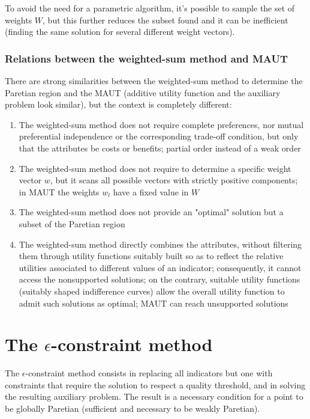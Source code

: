 To avoid the need for a parametric algorithm, it's possible to sample the set of weights $W$, but this further reduces the subset found and it can be inefficient (finding the same solution for several different weight vectors).

\subsubsection{Relations between the weighted-sum method and MAUT}

There are strong similarities between the weighted-sum method to determine the Paretian region and the MAUT (additive utility function and the auxiliary problem look similar), but the context is completely different:
\begin{enumerate}
	\item The weighted-sum method does not require complete preferences, nor mutual preferential independence or the corresponding trade-off condition, but only that the attributes be costs or benefits; partial order instead of a weak order
	
	\item The weighted-sum method does not require to determine a specific weight vector $w$, but it scans all possible vectors with strictly positive components; in MAUT the weights $w_l$ have a fixed value in $W$
	
	\item The weighted-sum method does not provide an "optimal" solution but a subset of the Paretian region 
	
	\item The weighted-sum method directly combines the attributes, without filtering them through utility functions suitably built so as to reflect the relative utilities associated to different values of an indicator; consequently, it cannot access the nonsupported solutions; on the contrary, suitable utility functions (suitably shaped indifference curves) allow the overall utility function to admit such solutions as optimal; MAUT can reach unsupported solutions
\end{enumerate}

\section{The $\epsilon$-constraint method}
\label{sec:epsconstraint}

The $\epsilon$-constraint method consists in replacing all indicators but one with constraints that require the solution to respect a quality threshold, and in solving the resulting auxiliary problem. The result is a necessary condition for a point to be globally Paretian (sufficient and necessary to be weakly Paretian).

